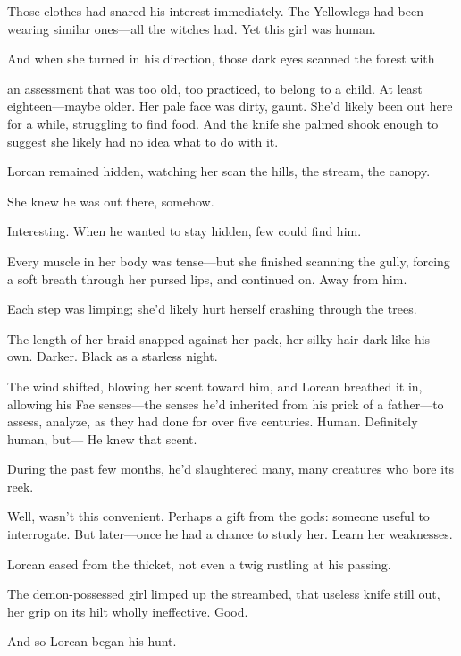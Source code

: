 Those clothes had snared his interest immediately. The Yellowlegs had been wearing similar ones---all the witches had. Yet this girl was human.

And when she turned in his direction, those dark eyes scanned the forest with

an assessment that was too old, too practiced, to belong to a child. At least eighteen---maybe older. Her pale face was dirty, gaunt. She'd likely been out here for a while, struggling to find food. And the knife she palmed shook enough to suggest she likely had no idea what to do with it.

Lorcan remained hidden, watching her scan the hills, the stream, the canopy.

She knew he was out there, somehow.

Interesting. When he wanted to stay hidden, few could find him.

Every muscle in her body was tense---but she finished scanning the gully, forcing a soft breath through her pursed lips, and continued on. Away from him.

Each step was limping; she'd likely hurt herself crashing through the trees.

The length of her braid snapped against her pack, her silky hair dark like his own. Darker. Black as a starless night.

The wind shifted, blowing her scent toward him, and Lorcan breathed it in, allowing his Fae senses---the senses he'd inherited from his prick of a father---to assess, analyze, as they had done for over five centuries. Human. Definitely human, but--- He knew that scent.

During the past few months, he'd slaughtered many, many creatures who bore its reek.

Well, wasn't this convenient. Perhaps a gift from the gods: someone useful to interrogate. But later---once he had a chance to study her. Learn her weaknesses.

Lorcan eased from the thicket, not even a twig rustling at his passing.

The demon-possessed girl limped up the streambed, that useless knife still out, her grip on its hilt wholly ineffective. Good.

And so Lorcan began his hunt.
